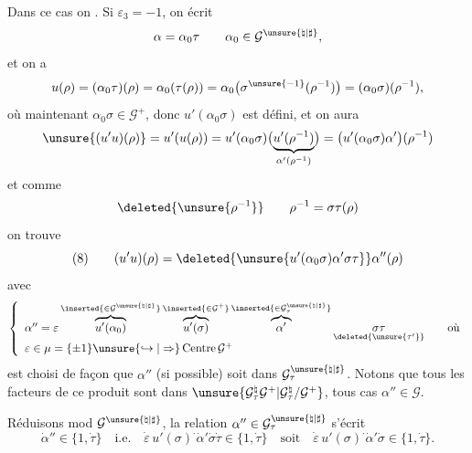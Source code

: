 Dans ce cas on . Si $\varepsilon_3=-1$, on écrit
\[
\alpha=\alpha_0\tau\qquad
\alpha_0\in\mathcal{G}^{\unsure{\natural|\sharp}},
\]
et on a
\[
u(\rho)=(\alpha_0\tau)(\rho)=\alpha_0(\tau(\rho))
=\alpha_0\bigl(\sigma^{\unsure{-1}}(\rho^{-1})\bigr)
=(\alpha_0\sigma)(\rho^{-1}),
\]
où maintenant $\alpha_0\sigma\in\mathcal{G}^{+}$, donc
$u'(\alpha_0\sigma)$ est défini, et on aura
\[
\unsure{(u'u)(\rho)}
=u'(u(\rho))
=u'(\alpha_0\sigma)
\bigl(\underbrace{u'(\rho^{-1})}_{\alpha'(\rho^{-1})}\bigr)
=\bigl(u'(\alpha_0\sigma)\alpha'\bigr)(\rho^{-1})
\]
et comme
\[
\deleted{\unsure{\rho^{-1}}}\qquad
\rho^{-1}=\sigma\tau(\rho)
\]
on trouve
\[
(8)\qquad
(u'u)(\rho)=
\deleted{\unsure{u'(\alpha_0\sigma)\alpha'\sigma\tau}}
\alpha''(\rho)
\]
avec
\[
\left\{
\begin{array}{l}
\alpha''=\varepsilon
\overbrace{u'(\alpha_0)}^{\inserted{\in\mathcal{G}^{\unsure{\natural|\sharp}}}}
\overbrace{u'(\sigma)}^{\inserted{\in\mathcal{G}^{+}}}
\overbrace{\alpha'}^{\inserted{\in\mathcal{G}^{\unsure{\natural|\sharp}}_\tau}}
\underset{\deleted{\unsure{\tau'}}}{\sigma\tau}
\qquad\text{où}\\
\varepsilon\in\mu=\{\pm1\}
\unsure{\hookrightarrow|\Rightarrow}\operatorname{Centre}\mathcal{G}^{+}
\end{array}
\right.
\]
 est choisi de façon que $\alpha''$ (si possible)
soit dans $\mathcal{G}^{\unsure{\natural|\sharp}}_\tau$.
Notons que tous les facteurs de ce produit sont dans
$\unsure{\mathcal{G}^{\natural}_\tau\mathcal{G}^{+}|
\mathcal{G}^{\natural}_\tau/\mathcal{G}^{+}}$,
 tous cas $\alpha''\in\mathcal{G}$.



Réduisons mod $\mathcal{G}^{\unsure{\natural|\sharp}}$,
la relation $\alpha''\in\mathcal{G}^{\unsure{\natural|\sharp}}_\tau$
s'écrit
\[
\dot{\alpha}''\in\{1,\dot{\tau}\}\quad\text{i.e.}\quad
\dot{\varepsilon}\,u'(\sigma)^{\cdot}\dot{\alpha}'\dot{\sigma}\dot{\tau}
\in\{1,\dot{\tau}\}
\quad\text{soit}\quad
\dot{\varepsilon}\,u'(\sigma)^{\cdot}\dot{\alpha}'\dot{\sigma}
\in\{1,\dot{\tau}\}.
\]

